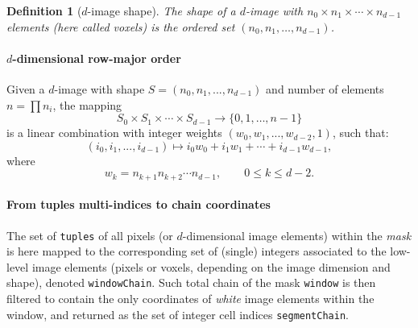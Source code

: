 \documentclass[11pt,oneside]{article}	%
\newtheorem{definition}{Definition}
\begin{document}
\begin{definition}[$d$-image shape]
The \emph{shape} of a $d$-image with $n_0\times n_1 \times\cdots\times n_{d-1}$ elements (here called \emph{voxels}) is the ordered set $(n_0, n_1, \ldots, n_{d-1})$.
\end{definition}


\paragraph{$d$-dimensional row-major order}

Given a $d$-image with shape $S=(n_0,n_1,...,n_{d-1})$ and number of elements $n=\prod n_i$, 
the mapping  
\[
S_0 \times S_1 \times \cdots \times S_{d-1} \to \{ 0, 1, \ldots, n-1\}
\]
 is a {linear combination} with integer {weights}  $(w_0,w_1,...,w_{d-2},1)$, such that:
\[
(i_0,i_1,...,i_{d-1}) \mapsto i_0 w_0 +i_1 w_1 +\cdots +i_{d-1} w_{d-1},
\]
where 
\[
w_k = n_{k+1}  n_{k+2} \cdots  n_{d-1}, \qquad 0\leq k\leq d-2.
\]

\paragraph{From tuples multi-indices to chain coordinates}

The set of \texttt{tuples} of all pixels (or $d$-dimensional image elements) within the \emph{mask} is here mapped to the corresponding set of (single) integers associated to the low-level image elements (pixels or voxels, depending on the image dimension and shape), denoted \texttt{windowChain}. Such total chain of the mask \texttt{window} is then filtered to contain the only coordinates of \emph{white} image elements within the window, and returned as the set of integer cell indices \texttt{segmentChain}.
\end{document}
